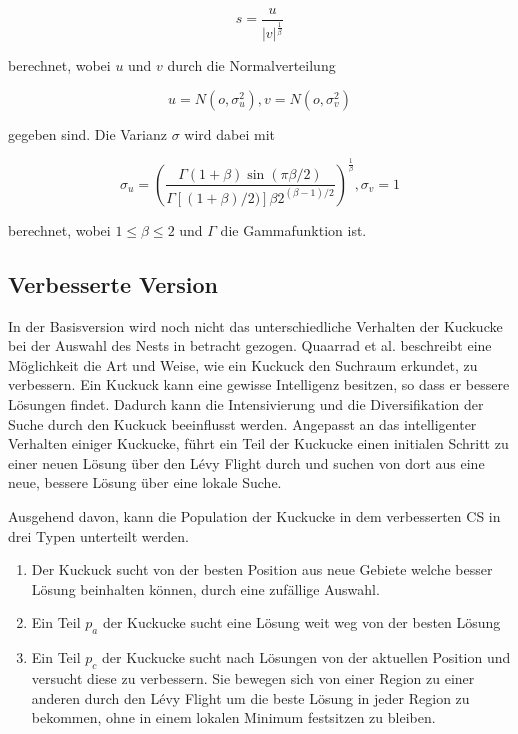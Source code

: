 \documentclass[conference]{IEEEtran}
\begin{document}
      \begin{equation}
        s = \frac{u}{|v|^{\frac{1}{\beta}}}\label{eq}
      \end{equation}

      berechnet, wobei $u$ und $v$ durch die Normalverteilung

      \begin{equation}
        u = N(o,\sigma_{u}^{2}), v = N(o,\sigma_{v}^{2})\label{eq}
      \end{equation}

        gegeben sind. Die Varianz $\sigma$ wird dabei mit

      \begin{equation}
        \sigma_{u} = \left(\frac{\Gamma(1 + \beta)\sin(\pi\beta/2)}{\Gamma[(1 + \beta)/2)]\beta2^{(\beta-1)/2}}\right)^{\frac{1}{\beta}} , \sigma_{v} = 1 \label{eq}
      \end{equation}

      berechnet, wobei $1 \leq \beta \leq 2$ und $\Gamma$ die Gammafunktion ist. 

    \subsection{Verbesserte Version}
      In der Basisversion wird noch nicht das unterschiedliche Verhalten der Kuckucke bei der Auswahl 
      des Nests in betracht gezogen. Quaarrad et al. \cite{b9} beschreibt eine Möglichkeit die Art und 
      Weise, wie ein Kuckuck den Suchraum erkundet, zu verbessern. Ein Kuckuck kann eine gewisse Intelligenz 
      besitzen, so dass er bessere Lösungen findet. Dadurch kann die Intensivierung und die Diversifikation der 
      Suche durch den Kuckuck beeinflusst werden. Angepasst an das intelligenter Verhalten einiger Kuckucke, 
      führt ein Teil der Kuckucke einen initialen Schritt zu einer neuen Lösung über 
      den Lévy Flight durch und suchen von dort aus eine neue, bessere Lösung über eine lokale Suche.

      Ausgehend davon, kann die Population der Kuckucke in dem verbesserten CS in drei Typen unterteilt werden.

      \begin{enumerate}
        \item Der Kuckuck sucht von der besten Position aus neue Gebiete welche besser Lösung beinhalten können, durch eine zufällige Auswahl.
        \item Ein Teil $p_{a}$ der Kuckucke sucht eine Lösung weit weg von der besten Lösung
        \item Ein Teil $p_{c}$ der Kuckucke sucht nach Lösungen von der aktuellen Position und versucht diese zu 
          verbessern. Sie bewegen sich von einer Region zu einer anderen durch den Lévy Flight um die beste Lösung 
          in jeder Region zu bekommen, ohne in einem lokalen Minimum festsitzen zu bleiben.
      \end{enumerate}
\end{document}
